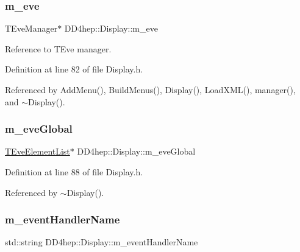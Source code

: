 \subsubsection{\texorpdfstring{m\+\_\+eve}{m\_eve}}
{\footnotesize\ttfamily T\+Eve\+Manager$\ast$ D\+D4hep\+::\+Display\+::m\+\_\+eve\hspace{0.3cm}{\ttfamily [protected]}}



Reference to T\+Eve manager. 



Definition at line 82 of file Display.\+h.



Referenced by Add\+Menu(), Build\+Menus(), Display(), Load\+X\+M\+L(), manager(), and $\sim$\+Display().

\hypertarget{class_d_d4hep_1_1_display_a8d60b9f25c9907af4f9efa64363d8c85}{}\label{class_d_d4hep_1_1_display_a8d60b9f25c9907af4f9efa64363d8c85} 
\subsubsection{\texorpdfstring{m\+\_\+eve\+Global}{m\_eveGlobal}}
{\footnotesize\ttfamily \hyperlink{class_t_eve_element_list}{T\+Eve\+Element\+List}$\ast$ D\+D4hep\+::\+Display\+::m\+\_\+eve\+Global\hspace{0.3cm}{\ttfamily [protected]}}



Definition at line 88 of file Display.\+h.



Referenced by $\sim$\+Display().

\hypertarget{class_d_d4hep_1_1_display_a0a6d204fcf140071018ef6cb3040c19b}{}\label{class_d_d4hep_1_1_display_a0a6d204fcf140071018ef6cb3040c19b} 
\subsubsection{\texorpdfstring{m\+\_\+event\+Handler\+Name}{m\_eventHandlerName}}
{\footnotesize\ttfamily std\+::string D\+D4hep\+::\+Display\+::m\+\_\+event\+Handler\+Name\hspace{0.3cm}{\ttfamily [protected]}}



